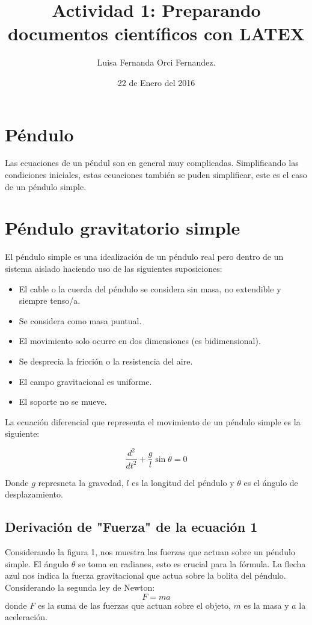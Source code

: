 \documentclass[12pt,letterpaper]{article}
\begin{document}
\title{Actividad 1: Preparando documentos científicos con LATEX}
\author{Luisa Fernanda Orci Fernandez.}
\date{22 de Enero del 2016}

\maketitle

\section*{Péndulo}
Las ecuaciones de un péndul son en general muy complicadas. Simplificando las condiciones iniciales, estas ecuaciones también se puden simplificar, este es el caso de un péndulo simple.

\section{Péndulo gravitatorio simple}
El péndulo simple es una idealización de un péndulo real pero dentro de un sistema aislado haciendo uso de las siguientes suposiciones:

\begin{itemize}

\item El cable o la cuerda del péndulo se considera sin masa, no extendible y siempre tenso/a.
\item Se considera como masa puntual.
\item El movimiento solo ocurre en dos dimensiones (es bidimensional).
\item Se desprecia la fricción o la resistencia del aire.
\item El campo gravitacional es uniforme.
\item El soporte no se mueve.


\end{itemize}

La ecuación diferencial que representa el movimiento de un péndulo simple es la siguiente:

\begin{equation}
\frac{d^2}{dt^2} + \frac{g}{l}\sin\theta = 0
\end{equation}

Donde $g$ represneta la gravedad, $l$ es la longitud del péndulo y $\theta$ es el ángulo de desplazamiento.

\subsection{Derivación de "Fuerza" de la ecuación 1}
Considerando la figura 1, nos muestra las fuerzas que actuan sobre un péndulo simple. El ángulo $\theta$ se toma en radianes, esto es crucial para la fórmula. La flecha azul nos indica la fuerza gravitacional que actua sobre la bolita del péndulo. 
Considerando la segunda ley de Newton: $$ F = ma $$ donde $F$ es la suma de las fuerzas que actuan sobre el objeto, $m$ es la masa y $a$ la aceleración.
\end{document}
